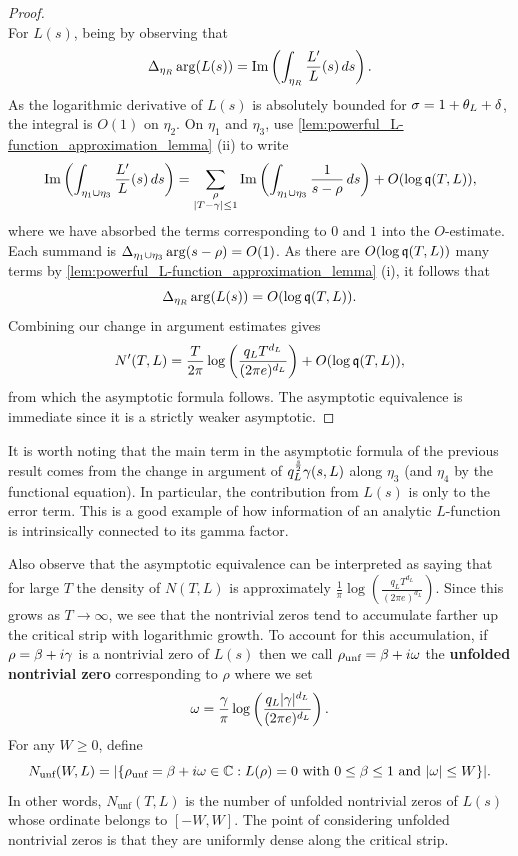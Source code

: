 \begin{proof}
\[      \]
      For \(L(s)\), being by observing that
      \[
        \Delta_{\eta_{R}}\arg(L(s)) = \mathrm{Im}\left(\int_{\eta_{R}}\frac{L'}{L}(s)\,ds\right).
      \]
      As the logarithmic derivative of \(L(s)\) is absolutely bounded for \(\sigma = 1+\theta_{L}+\delta\), the integral is \(O(1)\) on \(\eta_{2}\). On \(\eta_{1}\) and \(\eta_{3}\), use \cref{lem:powerful_L-function_approximation_lemma} (ii) to write
      \[
        \mathrm{Im}\left(\int_{\eta_{1} \cup \eta_{3}}\frac{L'}{L}(s)\,ds\right) = \sum_{\substack{\rho \\ |T-\gamma| \le 1}}\mathrm{Im}\left(\int_{\eta_{1} \cup \eta_{3}}\frac{1}{s-\rho}\,ds\right)+O(\log\mathfrak{q}(T,L)),
      \]
      where we have absorbed the terms corresponding to \(0\) and \(1\) into the \(O\)-estimate. Each summand is \(\Delta_{\eta_{1} \cup \eta_{3}}\arg(s-\rho) = O(1)\). As there are \(O(\log\mathfrak{q}(T,L))\) many terms by \cref{lem:powerful_L-function_approximation_lemma} (i), it follows that
      \[
        \Delta_{\eta_{R}}\arg(L(s)) = O(\log{\mathfrak{q}(T,L)}).
      \]
      Combining our change in argument estimates gives
      \[
        N'(T,L) = \frac{T}{2\pi}\log\left(\frac{q_{L}T^{d_{L}}}{(2\pi e)^{d_{L}}}\right)+O(\log{\mathfrak{q}(T,L)}),
      \]
      from which the asymptotic formula follows. The asymptotic equivalence is immediate since it is a strictly weaker asymptotic.
    \end{proof}

    It is worth noting that the main term in the asymptotic formula of the previous result comes from the change in argument of \(q_{L}^{\frac{s}{2}}\gamma(s,L)\) along \(\eta_{3}\) (and \(\eta_{4}\) by the functional equation). In particular, the contribution from \(L(s)\) is only to the error term. This is a good example of how information of an analytic \(L\)-function is intrinsically connected to its gamma factor.
    
    Also observe that the asymptotic equivalence can be interpreted as saying that for large \(T\) the density of \(N(T,L)\) is approximately \(\frac{1}{\pi}\log\left(\frac{q_{L}T^{d_{L}}}{(2\pi e)^{d_{L}}}\right)\). Since this grows as \(T \to \infty\), we see that the nontrivial zeros tend to accumulate farther up the critical strip with logarithmic growth. To account for this accumulation, if \(\rho = \beta+i\gamma\) is a nontrivial zero of \(L(s)\) then we call \(\rho_{\text{unf}} = \beta+i\omega\) the \textbf{unfolded nontrivial zero} corresponding to \(\rho\) where we set
    \[
      \omega = \frac{\gamma}{\pi}\log\left(\frac{q_{L}|\gamma|^{d_{L}}}{(2\pi e)^{d_{L}}}\right).
    \]
    For any \(W \ge 0\), define
    \[
      N_{\text{unf}}(W,L) = |\{\rho_{\text{unf}} = \beta+i\omega \in \mathbb{C}:L(\rho) = 0 \text{ with } 0 \le \beta \le 1 \text{ and } |\omega| \le W\}|.
    \]
    In other words, \(N_{\text{unf}}(T,L)\) is the number of unfolded nontrivial zeros of \(L(s)\) whose ordinate belongs to \([-W,W]\). The point of considering unfolded nontrivial zeros is that they are uniformly dense along the critical strip.

